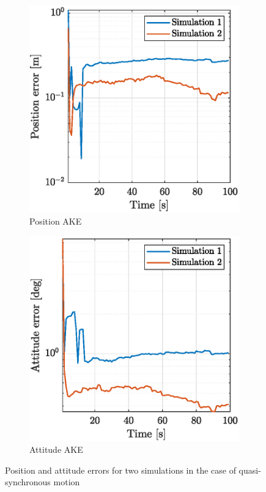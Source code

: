 \begin{figure}[!h]
    \begin{subfigure}{0.48\linewidth}
        \centering
        \includegraphics[width = \linewidth]{Images/synchpos.eps}
        \caption{Position AKE}
    \end{subfigure}\hfill
    \begin{subfigure}{0.48\linewidth}
        \centering
        \includegraphics[width = \linewidth]{Images/synchatt.eps}
        \caption{Attitude AKE}
    \end{subfigure}
    \caption[Position and attitude errors in the case of quasi-synchronous motion]{Position and attitude errors for two simulations in the case of quasi-synchronous motion}
    \label{fig:syncherrors}
\end{figure}

